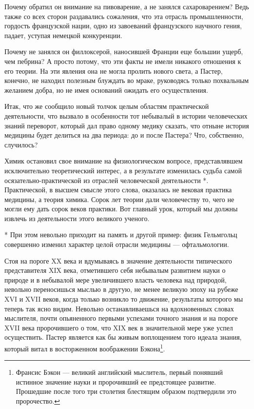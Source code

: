 Почему   обратил   он   внимание   на  пивоварение,   а   не   занялся
сахароварением? Ведь  также со всех сторон  раздавались сожаления, что
эта  отрасль  промышленности,  гордость  французской  нации,  одно  из
завоеваний  французского  научного  гения,  падает,  уступая  немецкой
конкуренции.

Почему  не  занялся он  филлоксерой,  наносившей  Франции еще  большии
ущерб, чем пебрина?  А просто потому, что эти факты  не имели никакого
отношения к  его теории. На  эти явления  она не могла  пролить нового
света,  а Пастер,  конечно,  не находил  полезным  блуждать во  мраке,
руководясь  только похвальным  желанием  добра, но  не имея  оснований
ожидать его осуществления.

Итак,  что  же  сообщило  новый  толчок  целым  областям  практической
деятельности,  что  вызвало  в  особенности тот  небывалый  в  истории
человеческих  знаний  переворот,  который   дал  право  одному  медику
сказать, что отныне история медицины будет делиться на два периода: до
и после Пастера? Что, собственно, случилось?

Химик   остановил   свое    внимание   на   физиологическом   вопросе,
представлявшем  исключительно теоретический  интерес,  а в  результате
изменилась   судьба   самой   осязательно-практической   из   отраслей
человеческой  деятельности  *.  Практической, в  высшем  смысле  этого
слова, оказалась не вековая практика  медицины, а теория химика. Сорок
лет теории  дали человечеству то, чего  не могли ему дать  сорок веков
практики. Вот главный урок, который  мы должны извлечь из деятельности
этого великого ученого.

*  При  этом  невольно  приходит  на память  и  другой  пример:  физик
Гельмгольц  совершенно изменил  характер  целой  отрасли медицины  ---
офтальмологии.

Стоя  на  пороге   XX  века  и  вдумываясь   в  значение  деятельности
типического  представителя   XIX  века,  отметившего   себя  небывалым
развитием  науки о  природе  и в  небывалой  мере увеличившего  власть
человека над природой, невольно переносишься мыслью в другую, не менее
великую эпоху  на рубеже XVI  и XVII  веков, когда только  возникло то
движение,  результаты  которого мы  теперь  так  ясно видим.  Невольно
останавливаешься на  вдохновенных словах мыслителя,  почти опьяненного
первыми успехами точного  знания и на пороге XVII  века пророчившего о
том, что  XIX век  в значительной мере  уже успел  осуществить. Пастер
является как бы живым воплощением  того идеала знания, который витал в
восторженном  воображении  Бэкона\footnote{Франсис Бэкон  ---  великий
английский  мыслитель,  первый  понявший  истинное  значение  науки  и
пророчивший ее предстоящее развитие. Прошедшие после того три столетия
блестящим образом подтвердили это пророчество.}.

